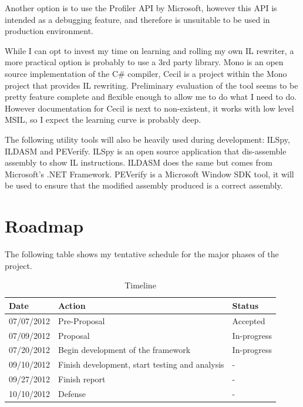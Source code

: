 Another option is to use the Profiler API by Microsoft, however this API is intended as a debugging feature, and therefore is unsuitable to be used in production environment.

While I can opt to invest my time on learning and rolling my own IL rewriter, a more practical option is probably to use a 3rd party library. Mono is an open source implementation of the C\# compiler, Cecil is a project within the Mono project that provides IL rewriting. Preliminary evaluation of the tool seems to be pretty feature complete and flexible enough to allow me to do what I need to do. However documentation for Cecil is next to non-existent, it works with low level MSIL, so I expect the learning curve is probably deep.

The following utility tools will also be heavily used during development: ILSpy, ILDASM and PEVerify. ILSpy is an open source application that dis-assemble assembly to show IL instructions. ILDASM does the same but comes from Microsoft’s .NET Framework. PEVerify is a Microsoft Window SDK tool, it will be used to ensure that the modified assembly produced is a correct assembly.

\section{Roadmap}
The following table shows my tentative schedule for the major phases of the project.

\begin{table}[h]
\centering
\begin{tabular}{|l|l|l|}
\hline
Date & Action & Status\\
\hline
07/07/2012 & Pre-Proposal & Accepted\\
07/09/2012 & Proposal & In-progress\\
07/20/2012 & Begin development of the framework & In-progress\\
09/10/2012 & Finish development, start testing and analysis & - \\
09/27/2012 & Finish report & - \\
10/10/2012 & Defense & - \\
\hline
\end{tabular}
\caption{Timeline}
\label{tab:template}
\end{table}



\singlespacing




